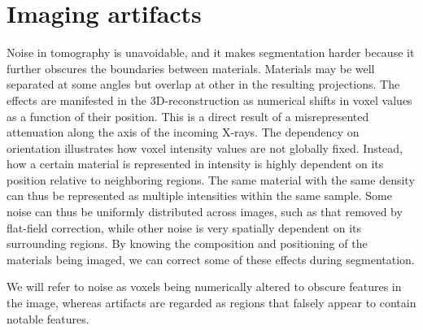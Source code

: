 \section{Imaging artifacts}
\label{sec:imaging}

Noise in tomography is unavoidable, and it makes segmentation harder because it
further obscures the boundaries between materials.  Materials may be well
separated at some angles but overlap at other in the resulting projections.
The effects are manifested in the 3D-reconstruction as numerical shifts in
voxel values as a function of their position. This is a direct result of a
misrepresented attenuation along the axis of the incoming X-rays.  The
dependency on orientation illustrates how voxel intensity values are not
globally fixed. Instead, how a certain material is represented in intensity is
highly dependent on its position relative to neighboring regions. The same
material with the same density can thus be represented as multiple intensities
within the same sample.  Some noise can thus be uniformly distributed across
images, such as that removed by flat-field correction, while other noise is
very spatially dependent on its surrounding regions. By knowing the composition
and positioning of the materials being imaged, we can correct some of these
effects during segmentation.

We will refer to noise as voxels being numerically altered to obscure features
in the image, whereas artifacts are regarded as regions that falsely appear to
contain notable features.

